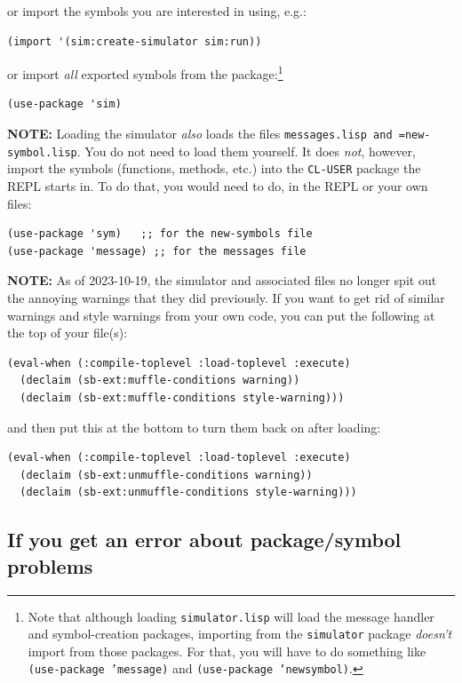 \documentclass[11pt]{tufte-handout}
\begin{document}
\noindent or import the symbols you are interested in using, e.g.:
\begin{verbatim}
(import '(sim:create-simulator sim:run))
\end{verbatim}

\noindent or import \emph{all} exported symbols from the package:\footnote{Note that although loading \texttt{simulator.lisp} will load the message handler and symbol-creation packages, importing from the \texttt{simulator} package \emph{doesn't} import from those packages.  For that, you will have to do something like \texttt{(use-package 'message)} and \texttt{(use-package 'newsymbol)}.}
\begin{verbatim}
(use-package 'sim)
\end{verbatim}


\textbf{NOTE:} Loading the simulator \emph{also} loads the files \texttt{messages.lisp and =new-symbol.lisp}.  You do not need to load them yourself.  It does \emph{not}, however, import the symbols (functions, methods, etc.) into the \texttt{CL-USER} package the REPL starts in.  To do that, you would need to do, in the REPL or your own files:
\begin{verbatim}
(use-package 'sym)   ;; for the new-symbols file
(use-package 'message) ;; for the messages file
\end{verbatim}


\textbf{NOTE:} As of 2023-10-19, the simulator and associated files no longer spit out the annoying warnings that they did previously. If you want to get rid of similar warnings and style warnings from your own code, you can put the following at the top of your file(s):
\begin{verbatim}
(eval-when (:compile-toplevel :load-toplevel :execute)
  (declaim (sb-ext:muffle-conditions warning))
  (declaim (sb-ext:muffle-conditions style-warning)))
\end{verbatim}
\noindent
and then put this at the bottom to turn them back on after loading:
\begin{verbatim}
(eval-when (:compile-toplevel :load-toplevel :execute)
  (declaim (sb-ext:unmuffle-conditions warning))
  (declaim (sb-ext:unmuffle-conditions style-warning)))
\end{verbatim}



\subsection{If you get an error about package/symbol problems}
\label{sec:org193f514}
\end{document}
